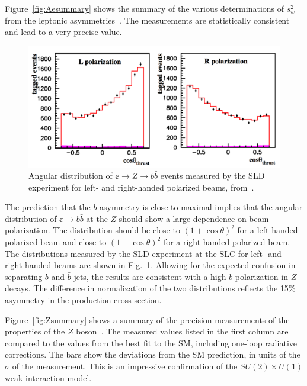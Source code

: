 \documentclass[12pt]{article}
\begin{document}
Figure~\ref{fig:Aesummary} shows the summary of the various
determinations of $s_w^2$ from the leptonic asymmetries~\cite{LEPEWWG}.   The
measurements are statistically consistent and lead to a very precise
value.

\begin{figure}
\begin{center}
\includegraphics[width=0.80\hsize]{SLDbdist.pdf}
\end{center}
\caption{Angular distribution of $\ee\to Z\to b\bar b$ events measured
  by the SLD experiment for left- and right-handed polarized beams,
  from~\cite{SLDbpol}. }
\label{fig:bdist}
\end{figure}


The prediction that the $b$ asymmetry is close to maximal implies that
the angular distribution of $\ee\to b\bar b$ at the $Z$ should show a
large dependence on beam polarization.  The distribution should be
close to $(1+\cos\theta)^2$ for a left-handed polarized beam and close
to $(1-\cos\theta)^2$ for a right-handed polarized beam.   The
distributions measured by the SLD experiment at the SLC  for left- and
right-handed beams are shown in
Fig.~\ref{fig:bdist}.   Allowing for the expected  confusion in
separating $b$ and $\bar b$ jets, the results are consistent with a
high $b$ polarization in $Z$ decays.  The difference in normalization
of the two distributions reflects the 15\% asymmetry in the production
cross section.

Figure~\ref{fig:Zsummary} shows a summary of the precision
measurements of the properties of the $Z$ boson~\cite{LEPEWWG}.
   The measured values 
listed in the first column are compared to the values from the best
fit to the SM, including one-loop radiative corrections.   The bars
show the deviations from the SM prediction, in units of the $\sigma$
of the measurement.  This is an impressive confirmation of the
$SU(2)\times U(1)$ weak interaction model.
\end{document}
